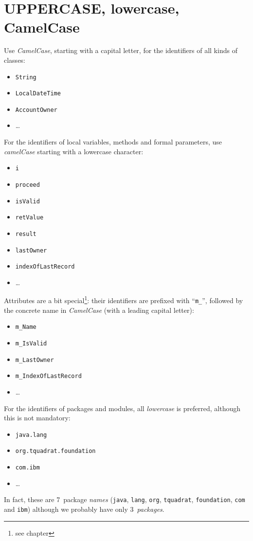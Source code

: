 \section{UPPERCASE, lowercase, CamelCase}\label{sec:CaseOfNames}
Use \textit{CamelCase}, starting with a capital letter, for the identifiers of all kinds of classes: 
\begin{itemize}[nosep]
	\item{\lstinline|String|}
	\item{\lstinline|LocalDateTime|}
	\item{\lstinline|AccountOwner|}
	\item{…}
\end{itemize}

For the identifiers of local variables, methods and formal parameters, use \textit{camelCase} starting with a lowercase character: 
\begin{itemize}[nosep]
	\item{\lstinline|i|}
	\item{\lstinline|proceed|}
	\item{\lstinline|isValid|}
	\item{\lstinline|retValue|}
	\item{\lstinline|result|}
	\item{\lstinline|lastOwner|}
	\item{\lstinline|indexOfLastRecord|}
	\item{…}
\end{itemize}

Attributes are a bit special\footnote{see chapter }: their identifiers are prefixed with “\verb#m_#”, followed by the concrete name in \textit{CamelCase} (with a leading capital letter):
\begin{itemize}[nosep]
	\item{\lstinline|m_Name|}
	\item{\lstinline|m_IsValid|}
	\item{\lstinline|m_LastOwner|}
	\item{\lstinline|m_IndexOfLastRecord|}
	\item{…}
\end{itemize}

For the identifiers of packages and modules, all \textit{lowercase} is preferred, although this is not mandatory:
\begin{itemize}[nosep]
	\item{\lstinline|java.lang|}
	\item{\lstinline|org.tquadrat.foundation|}
	\item{\lstinline|com.ibm|}
	\item{…}
\end{itemize}
In fact, these are 7~package \textit{names} (\lstinline|java|, \lstinline|lang|, \lstinline|org|, \lstinline|tquadrat|, \lstinline|foundation|, \lstinline|com| and \lstinline|ibm|) although we probably have only 3~\textit{packages}.

